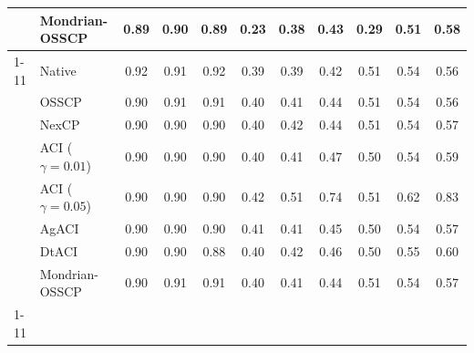 \begin{tabular}{@{}llccccccccc@{}}
 & Mondrian-OSSCP & 0.89 & 0.90 & 0.89 & 0.23 & 0.38 & 0.43 & 0.29 & 0.51 & 0.58 \\
\cmidrule{1-11}
\multirow[t]{8}{*}{GEFS power curve} & Native & 0.92 & 0.91 & 0.92 & 0.39 & 0.39 & 0.42 & 0.51 & 0.54 & 0.56 \\
 & OSSCP & 0.90 & 0.91 & 0.91 & 0.40 & 0.41 & 0.44 & 0.51 & 0.54 & 0.56 \\
 & NexCP & 0.90 & 0.90 & 0.90 & 0.40 & 0.42 & 0.44 & 0.51 & 0.54 & 0.57 \\
 & ACI ($\gamma=0.01$) & 0.90 & 0.90 & 0.90 & 0.40 & 0.41 & 0.47 & 0.50 & 0.54 & 0.59 \\
 & ACI ($\gamma=0.05$) & 0.90 & 0.90 & 0.90 & 0.42 & 0.51 & 0.74 & 0.51 & 0.62 & 0.83 \\
 & AgACI & 0.90 & 0.90 & 0.90 & 0.41 & 0.41 & 0.45 & 0.50 & 0.54 & 0.57 \\
 & DtACI & 0.90 & 0.90 & 0.88 & 0.40 & 0.42 & 0.46 & 0.50 & 0.55 & 0.60 \\
 & Mondrian-OSSCP & 0.90 & 0.91 & 0.91 & 0.40 & 0.41 & 0.44 & 0.51 & 0.54 & 0.57 \\
\cmidrule{1-11}
\bottomrule
\end{tabular}
